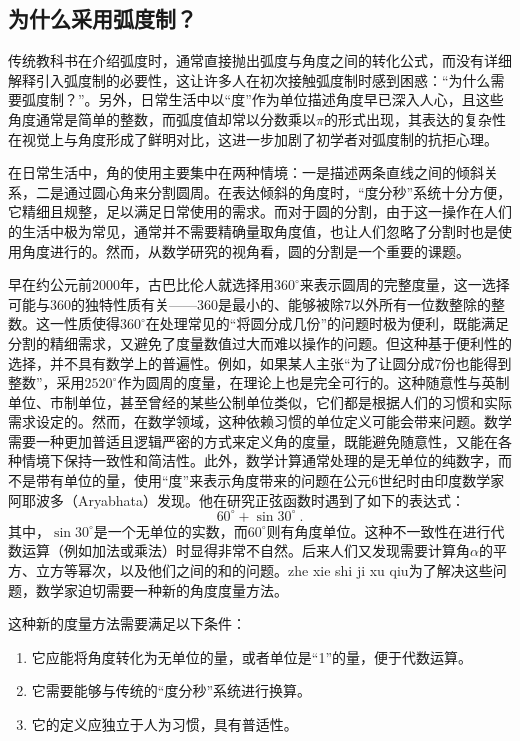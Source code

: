 \subsection{为什么采用弧度制？}

传统教科书在介绍弧度时，通常直接抛出弧度与角度之间的转化公式，而没有详细解释引入弧度制的必要性，这让许多人在初次接触弧度制时感到困惑：“为什么需要弧度制？”。另外，日常生活中以“度”作为单位描述角度早已深入人心，且这些角度通常是简单的整数，而弧度值却常以分数乘以$\pi$的形式出现，其表达的复杂性在视觉上与角度形成了鲜明对比，这进一步加剧了初学者对弧度制的抗拒心理。

在日常生活中，角的使用主要集中在两种情境：一是描述两条直线之间的倾斜关系，二是通过圆心角来分割圆周。在表达倾斜的角度时，“度分秒”系统十分方便，它精细且规整，足以满足日常使用的需求。而对于圆的分割，由于这一操作在人们的生活中极为常见，通常并不需要精确量取角度值，也让人们忽略了分割时也是使用角度进行的。然而，从数学研究的视角看，圆的分割是一个重要的课题。

早在约公元前2000年，古巴比伦人就选择用$360^\circ$来表示圆周的完整度量，这一选择可能与360的独特性质有关——360是最小的、能够被除7以外所有一位数整除的整数。这一性质使得$360^\circ$在处理常见的“将圆分成几份”的问题时极为便利，既能满足分割的精细需求，又避免了度量数值过大而难以操作的问题。但这种基于便利性的选择，并不具有数学上的普遍性。例如，如果某人主张“为了让圆分成7份也能得到整数”，采用$2520^\circ$作为圆周的度量，在理论上也是完全可行的。这种随意性与英制单位、市制单位，甚至曾经的某些公制单位类似，它们都是根据人们的习惯和实际需求设定的。然而，在数学领域，这种依赖习惯的单位定义可能会带来问题。数学需要一种更加普适且逻辑严密的方式来定义角的度量，既能避免随意性，又能在各种情境下保持一致性和简洁性。此外，数学计算通常处理的是无单位的纯数字，而不是带有单位的量，使用“度”来表示角度带来的问题在公元6世纪时由印度数学家阿耶波多（Aryabhata）发现。他在研究正弦函数时遇到了如下的表达式：
\begin{equation}
60^\circ+\sin30^\circ~.
\end{equation}
其中，$\sin 30^\circ$是一个无单位的实数，而$60^\circ$则有角度单位。这种不一致性在进行代数运算（例如加法或乘法）时显得非常不自然。后来人们又发现需要计算角$\alpha$的平方、立方等幂次，以及他们之间的和的问题。zhe xie shi ji xu qiu为了解决这些问题，数学家迫切需要一种新的角度度量方法。

这种新的度量方法需要满足以下条件：
\begin{enumerate}
\item 它应能将角度转化为无单位的量，或者单位是“1”的量，便于代数运算。
\item 它需要能够与传统的“度分秒”系统进行换算。
\item 它的定义应独立于人为习惯，具有普适性。
\end{enumerate}

